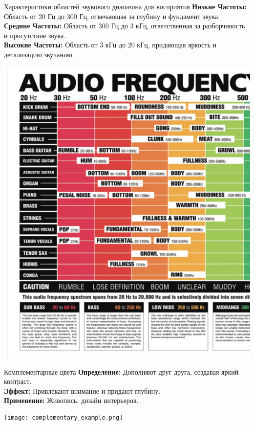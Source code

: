 \documentclass{beamer}
\begin{document}
\begin{frame}{Характеристики областей звукового диапазона для восприятия}
    \textbf{Низкие Частоты: } Область от 20 Гц до 300 Гц, отвечающая за глубину и фундамент звука. \\
    \vspace{0.3cm}
    \textbf{Средние Частоты: } Область от 300 Гц до 3 кГц, ответственная за разборчивость и присутствие звука. \\
    \vspace{0.3cm}
    \textbf{Высокие Частоты: } Область от 3 кГц до 20 кГц, придающая яркость и детализацию звучанию.
    \begin{center}
        \includegraphics[width=0.6\linewidth]{pic3.png} %
    \end{center}
\end{frame}

\begin{frame}{Комплементарные цвета}
    \textbf{Определение:} Дополняют друг друга, создавая яркий контраст. \\
    \vspace{0.3cm}
    \textbf{Эффект:} Привлекают внимание и придают глубину. \\
    \vspace{0.3cm}
    \textbf{Применение:} Живопись, дизайн интерьеров.
    \begin{center}
        \texttt{[image: complementary\_example.png]} %
    \end{center}
\end{frame}
\end{document}
